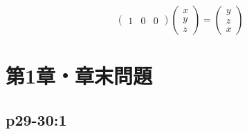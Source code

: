 \documentclass[uplatex,dvipdfmx,a4paper,11pt,fleqn]{jsarticle}
\begin{document}
\begin{tleftbar}
\begin{description}
\[\begin{pmatrix}
                1 & 0 & 0
            \end{pmatrix}
            \begin{pmatrix}
                x \\
                y \\
                z
            \end{pmatrix}
            =\begin{pmatrix}
                y \\
                z \\
                x
            \end{pmatrix}
            \]
        \end{description}
        \end{tleftbar}


        \setcounter{equation}{0}

\section*{第1章・章末問題}


\subsection*{p29-30:1}
\end{document}

